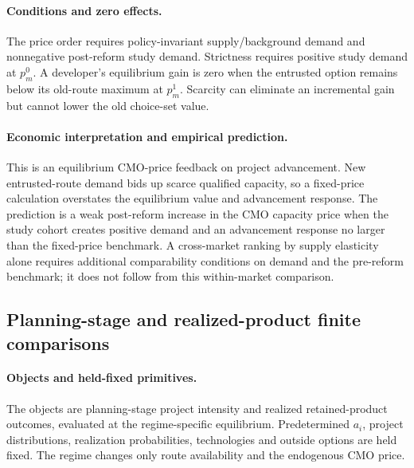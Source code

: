 \paragraph{Conditions and zero effects.}
The price order requires policy-invariant supply/background demand and
nonnegative post-reform study demand. Strictness requires positive study
demand at \(p_m^0\). A developer's equilibrium gain is zero when the
entrusted option remains below its old-route maximum at \(p_m^1\). Scarcity
can eliminate an incremental gain but cannot lower the old choice-set value.

\paragraph{Economic interpretation and empirical prediction.}
This is an equilibrium CMO-price feedback on project advancement. New
entrusted-route demand bids up scarce qualified capacity, so a fixed-price
calculation overstates the equilibrium value and advancement response. The
prediction is a weak post-reform increase in the CMO capacity price when the
study cohort creates positive demand and an advancement response no larger than the fixed-price benchmark. A
cross-market ranking by supply elasticity alone requires additional
comparability conditions on demand and the pre-reform benchmark; it does
not follow from this within-market comparison.

\subsection{Planning-stage and realized-product finite comparisons}
\label{subsec:p15-outcomes}

\paragraph{Objects and held-fixed primitives.}
The objects are planning-stage project intensity and realized retained-product
outcomes, evaluated at the regime-specific equilibrium. Predetermined
\(a_i\), project distributions, realization probabilities, technologies and
outside options are held fixed. The regime changes only route availability and
the endogenous CMO price.

